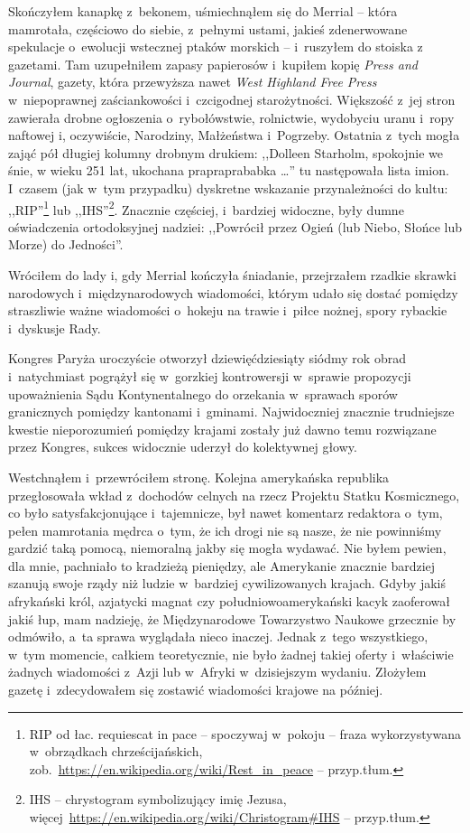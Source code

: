 \documentclass[oneside,polish,11pt,sfheadings]{mwbk}
\begin{document}
Skończyłem kanapkę z~bekonem, uśmiechnąłem się do Merrial -- która
mamrotała, częściowo do siebie, z~pełnymi ustami, jakieś zdenerwowane
spekulacje o~ewolucji wstecznej ptaków morskich -- i~ruszyłem do stoiska
z gazetami. Tam uzupełniłem zapasy papierosów i~kupiłem kopię
\textit{Press and Journal}, gazety, która przewyższa nawet \textit{West
Highland Free Press} w~niepoprawnej zaściankowości i~czcigodnej
starożytności. Większość z~jej stron zawierała drobne ogłoszenia o~rybołówstwie, rolnictwie, wydobyciu uranu i~ropy naftowej i, oczywiście,
Narodziny, Małżeństwa i~Pogrzeby. Ostatnia z~tych mogła zająć pół
długiej kolumny drobnym drukiem: ,,Dolleen Starholm, spokojnie we śnie,
w wieku 251 lat, ukochana prapraprababka \ldots '' tu następowała lista
imion. I~czasem (jak w~tym przypadku) dyskretne wskazanie przynależności
do kultu: ,,RIP''\footnote{ RIP od łac. requiescat in pace -- spoczywaj w~pokoju
-- fraza wykorzystywana w~obrządkach chrześcijańskich,
zob.~\url{https://en.wikipedia.org/wiki/Rest\_in\_peace} -- przyp.tłum.} lub ,,IHS''\footnote{ IHS -- chrystogram symbolizujący imię Jezusa,
więcej~\url{https://en.wikipedia.org/wiki/Christogram\#IHS} -- przyp.tłum.}. Znacznie częściej, i~bardziej widoczne, były dumne
oświadczenia ortodoksyjnej nadziei: ,,Powrócił przez Ogień (lub Niebo,
Słońce lub Morze) do Jedności''.

Wróciłem do lady i, gdy Merrial kończyła śniadanie, przejrzałem rzadkie
skrawki narodowych i~międzynarodowych wiadomości, którym udało się
dostać pomiędzy straszliwie ważne wiadomości o~hokeju na trawie i~piłce
nożnej, spory rybackie i~dyskusje Rady.

Kongres Paryża uroczyście otworzył dziewięćdziesiąty siódmy rok obrad i~natychmiast pogrążył się w~gorzkiej kontrowersji w~sprawie propozycji
upoważnienia Sądu Kontynentalnego do orzekania w~sprawach sporów
granicznych pomiędzy kantonami i~gminami. Najwidoczniej znacznie
trudniejsze kwestie nieporozumień pomiędzy krajami zostały już dawno
temu rozwiązane przez Kongres, sukces widocznie uderzył do kolektywnej
głowy.

Westchnąłem i~przewróciłem stronę. Kolejna amerykańska republika
przegłosowała wkład z~dochodów celnych na rzecz Projektu Statku
Kosmicznego, co było satysfakcjonujące i~tajemnicze, był nawet komentarz
redaktora o~tym, pełen mamrotania mędrca o~tym, że ich drogi nie są
nasze, że nie powinniśmy gardzić taką pomocą, niemoralną jakby się mogła
wydawać. Nie byłem pewien, dla mnie, pachniało to kradzieżą pieniędzy,
ale Amerykanie znacznie bardziej szanują swoje rządy niż ludzie w~bardziej cywilizowanych krajach. Gdyby jakiś afrykański król, azjatycki
magnat czy południowoamerykański kacyk zaoferował jakiś łup, mam
nadzieję, że Międzynarodowe Towarzystwo Naukowe grzecznie by odmówiło, a~ta sprawa wyglądała nieco inaczej. Jednak z~tego wszystkiego, w~tym
momencie, całkiem teoretycznie, nie było żadnej takiej oferty i~właściwie żadnych wiadomości z~Azji lub w~Afryki w~dzisiejszym wydaniu.
Złożyłem gazetę i~zdecydowałem się zostawić wiadomości krajowe na
później.
\end{document}
